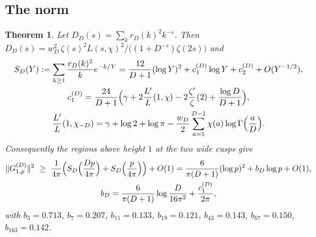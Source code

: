 \documentclass[11pt]{amsart}
\newtheorem{theorem}{Theorem}[section]
\theoremstyle{remark}
\begin{document}
\subsection{The norm}
\begin{theorem}\label{thm:norm}
Let $D_D(s)=\sum_kr_D(k)^2k^{-s}$. Then $D_D(s)=w_D^2\,\zeta(s)^2L(s,\chi)^2/\bigl((1+D^{-s})\zeta(2s)\bigr)$ and
\begin{gather*}
S_D(Y):=\sum_{k\ge1}\frac{r_D(k)^2}k e^{-k/Y}=\frac{12}{D+1}(\log Y)^2+c_1^{(D)}\log Y+c_2^{(D)}+O(Y^{-1/2}),\\
c_1^{(D)}=\frac{24}{D+1}\Bigl(\gamma+2\frac{L'}L(1,\chi)-2\frac{\zeta'}\zeta(2)+\frac{\log D}{D+1}\Bigr),\\
\frac{L'}L(1,\chi_{-D})=\gamma+\log2+\log\pi-\frac{w_D}2\sum_{a=1}^{D-1}\chi(a)\log\Gamma\Bigl(\frac aD\Bigr).
\end{gather*}
Consequently the regions above height $1$ at the two wide cusps give
\begin{gather*}
\|G^{(D)}_{1,p}\|^2\ \ge\ \frac1{4\pi}\Bigl(S_D\Bigl(\frac{Dp}{4\pi}\Bigr)+S_D\Bigl(\frac p{4\pi}\Bigr)\Bigr)+O(1)=\frac6{\pi(D+1)}(\log p)^2+b_D\log p+O(1),\\
b_D=\frac{6}{\pi(D+1)}\log\frac D{16\pi^2}+\frac{c_1^{(D)}}{2\pi},
\end{gather*}
with $b_3=0.713$, $b_7=0.207$, $b_{11}=0.133$, $b_{19}=0.121$, $b_{43}=0.143$, $b_{67}=0.150$, $b_{163}=0.142$.
\end{theorem}
\end{document}

